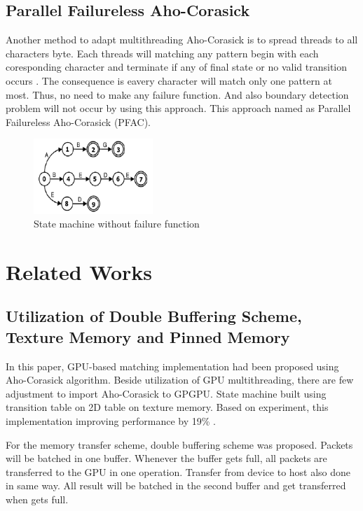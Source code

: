 \documentclass[conference]{IEEEtran}
\begin{document}
    \subsection{Parallel Failureless Aho-Corasick}
    Another method to adapt multithreading Aho-Corasick is to spread threads to all characters byte. Each threads will matching any pattern begin with each coresponding character and terminate if any of final state or no valid transition occurs \cite{lin2013}. The consequence is eavery character will match only one pattern at most.
    Thus, no need to make any failure function. And also boundary detection problem will not occur by using this approach. This approach named as Parallel Failureless Aho-Corasick (PFAC).

    \begin{figure}[htbp]
        \centerline{\includegraphics[width=0.4\textwidth]{../src/resources/pfac.png}}
        \caption{State machine without failure function}
    \end{figure} 

\section{Related Works}

    \subsection{Utilization of Double Buffering Scheme, Texture Memory and Pinned Memory}

        In this paper, GPU-based matching implementation had been proposed using Aho-Corasick algorithm. Beside utilization of GPU multithreading, there are few adjustment to import Aho-Corasick to GPGPU. State machine built using transition table on 2D table on texture memory. Based on experiment, this implementation improving performance by 19\% \cite{gnort2008}.
        
        For the memory transfer scheme, double buffering scheme was proposed. Packets will be batched in one buffer. Whenever the buffer gets full, all packets are transferred to the GPU in one operation. Transfer from device to host also done in same way. All result will be batched in the second buffer and get transferred when gets full.
        
\end{document}

